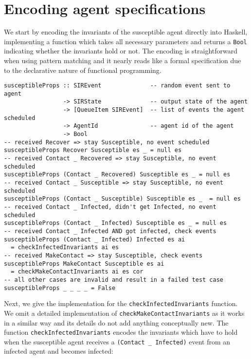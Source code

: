 \section{Encoding agent specifications}
\label{sec:method}
We start by encoding the invariants of the susceptible agent directly into Haskell, implementing a function which takes all necessary parameters and returns a \texttt{Bool} indicating whether the invariants hold or not. The encoding is straightforward when using pattern matching and it nearly reads like a formal specification due to the declarative nature of functional programming.

\begin{footnotesize}
\begin{verbatim}
susceptibleProps :: SIREvent              -- random event sent to agent
                 -> SIRState              -- output state of the agent
                 -> [QueueItem SIREvent]  -- list of events the agent scheduled
                 -> AgentId               -- agent id of the agent
                 -> Bool
-- received Recover => stay Susceptible, no event scheduled
susceptibleProps Recover Susceptible es _ = null es
-- received Contact _ Recovered => stay Susceptible, no event scheduled
susceptibleProps (Contact _ Recovered) Susceptible es _ = null es
-- received Contact _ Susceptible => stay Susceptible, no event scheduled
susceptibleProps (Contact _ Susceptible) Susceptible es _  = null es
-- received Contact _ Infected, didn't get Infected, no event scheduled
susceptibleProps (Contact _ Infected) Susceptible es _ = null es
-- received Contact _ Infected AND got infected, check events
susceptibleProps (Contact _ Infected) Infected es ai
  = checkInfectedInvariants ai es
-- received MakeContact => stay Susceptible, check events
susceptibleProps MakeContact Susceptible es ai
  = checkMakeContactInvariants ai es cor
-- all other cases are invalid and result in a failed test case
susceptibleProps _ _ _ _ = False
\end{verbatim}
\end{footnotesize}

Next, we give the implementation for the \texttt{checkInfectedInvariants} function. We omit a detailed implementation of \texttt{checkMakeContactInvariants} as it works in a similar way and its details do not add anything conceptually new. The function \texttt{checkInfectedInvariants} encodes the invariants which have to hold when the susceptible agent receives a \texttt{(Contact \_ Infected)} event from an infected agent and becomes infected:

